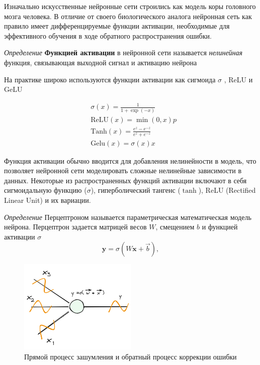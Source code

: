 Изначально искусственные нейронные сети строились как модель коры головного мозга человека. 
В отличие от своего биологического аналога нейронная сеть как правило имеет дифференцируемые функции активации, необходимые 
для эффективного обучения в ходе обратного распространения ошибки.

\textit{Определение} \textbf{Функцией активации} в нейронной сети называется \textit{нелинейная} функция,
связывающая выходной сигнал и активацию нейрона 

На практике широко используются функции активации как сигмоида $\sigma$ , ReLU \cite{agarap2018deep} и GeLU \cite{hendrycks2016gaussian}

\begin{equation}
  \begin{aligned}
    & \sigma(x) = \frac{1}{1+\exp(-x)} \\
    &\text{ReLU}(x) = \min(0,x)p \\
    &\text{Tanh}(x) = \frac{e^{z}-e^{-z}}{e^{z}+e^{-z}} \\
    &\text{Gelu}(x) = \sigma(x) x 
  \end{aligned}
\end{equation}

Функция активации обычно вводится для добавления нелинейности в модель, что позволяет нейронной сети моделировать сложные нелинейные зависимости в данных.
Некоторые из распространенных функций активации включают в себя сигмоидальную функцию (\( \sigma \)), гиперболический тангенс (\( \tanh \)), ReLU (Rectified Linear Unit) и их вариации.


\textit{Определение} Перцептроном называется параметрическая математическая модель нейрона. Перцептрон
задается матрицей весов $W$, смещением $b$ и функцией активации $\sigma$
\begin{equation}
  \mathbf{y} = \sigma(W \mathbf{x} + \vec{b}),
\end{equation}

\begin{figure}[h]
  \centering
  \includegraphics[width=0.5\textwidth]{assets/ml/nn/perceptron.excalidraw.png}
  \caption{Прямой процесс зашумления и обратный процесс коррекции ошибки \cite{stablediffusion}}
  \label{perceptron}
\end{figure}

